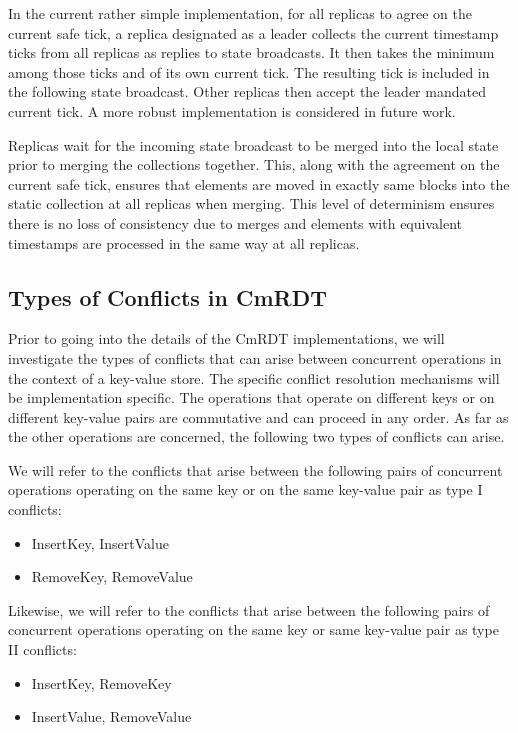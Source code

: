 \documentclass[sigconf,nonacm,10pt]{acmart}
\begin{document}
In the current rather simple implementation, for all replicas to agree on the current safe tick, a replica designated as a leader collects the current timestamp ticks from all replicas as replies to state broadcasts. It then takes the minimum among those ticks and of its own current tick. The resulting tick is included in the following state broadcast. Other replicas then accept the leader mandated current tick. A more robust implementation is considered in future work.

Replicas wait for the incoming state broadcast to be merged into the local state prior to merging the collections together. This, along with the agreement on the current safe tick, ensures that elements are moved in exactly same blocks into the static collection at all replicas when merging. This level of determinism ensures there is no loss of consistency due to merges and elements with equivalent timestamps are processed in the same way at all replicas.

\subsection{Types of Conflicts in CmRDT}
Prior to going into the details of the CmRDT implementations, we will investigate the types of conflicts that can arise between concurrent operations in the context of a key-value store. The specific conflict resolution mechanisms will be implementation specific. The operations that operate on different keys or on different key-value pairs are commutative and can proceed in any order. As far as the other operations are concerned, the following two types of conflicts can arise.

We will refer to the conflicts that arise between the following pairs of concurrent operations operating on the same key or on the same key-value pair as type I conflicts:
\begin{itemize}
 \item InsertKey, InsertValue
 \item RemoveKey, RemoveValue
\end{itemize}

Likewise, we will refer to the conflicts that arise between the following pairs of concurrent operations operating on the same key or same key-value pair as type II conflicts:
\begin{itemize}
 \item InsertKey, RemoveKey
 \item InsertValue, RemoveValue
\end{itemize}
\end{document}
